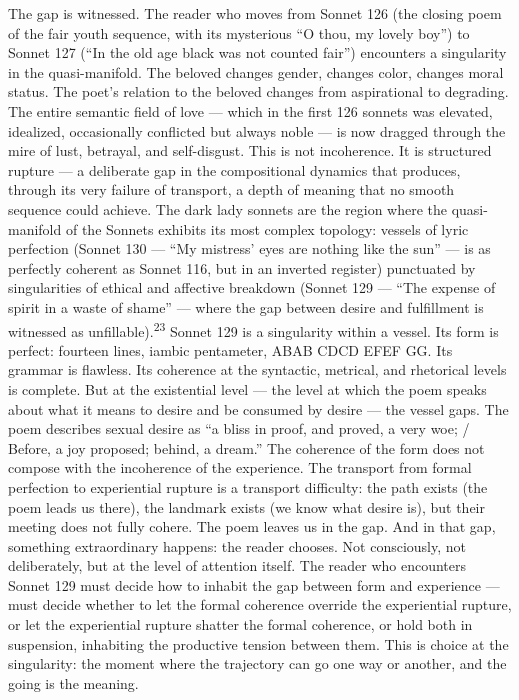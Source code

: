 The gap is witnessed. The reader who moves from Sonnet 126 (the closing poem of the fair youth sequence, with its mysterious “O thou, my lovely boy”) to Sonnet 127 (“In the old age black was not counted fair”) encounters a singularity in the quasi-manifold. The beloved changes gender, changes color, changes moral status. The poet’s relation to the beloved changes from aspirational to degrading. The entire semantic field of love — which in the first 126 sonnets was elevated, idealized, occasionally conflicted but always noble — is now dragged through the mire of lust, betrayal, and self-disgust. This is not incoherence. It is structured rupture — a deliberate gap in the compositional dynamics that produces, through its very failure of transport, a depth of meaning that no smooth sequence could achieve. The dark lady sonnets are the region where the quasi-manifold of the Sonnets exhibits its most complex topology: vessels of lyric perfection (Sonnet 130 — “My mistress’ eyes are nothing like the sun” — is as perfectly coherent as Sonnet 116, but in an inverted register) punctuated by singularities of ethical and affective breakdown (Sonnet 129 — “The expense of spirit in a waste of shame” — where the gap between desire and fulfillment is witnessed as unfillable).\textsuperscript{23} Sonnet 129 is a singularity within a vessel. Its form is perfect: fourteen lines, iambic pentameter, ABAB CDCD EFEF GG. Its grammar is flawless. Its coherence at the syntactic, metrical, and rhetorical levels is complete. But at the existential level — the level at which the poem speaks about what it means to desire and be consumed by desire — the vessel gaps. The poem describes sexual desire as “a bliss in proof, and proved, a very woe; / Before, a joy proposed; behind, a dream.” The coherence of the form does not compose with the incoherence of the experience. The transport from formal perfection to experiential rupture is a transport difficulty: the path exists (the poem leads us there), the landmark exists (we know what desire is), but their meeting does not fully cohere. The poem leaves us in the gap. And in that gap, something extraordinary happens: the reader chooses. Not consciously, not deliberately, but at the level of attention itself. The reader who encounters Sonnet 129 must decide how to inhabit the gap between form and experience — must decide whether to let the formal coherence override the experiential rupture, or let the experiential rupture shatter the formal coherence, or hold both in suspension, inhabiting the productive tension between them. This is choice at the singularity: the moment where the trajectory can go one way or another, and the going is the meaning.

